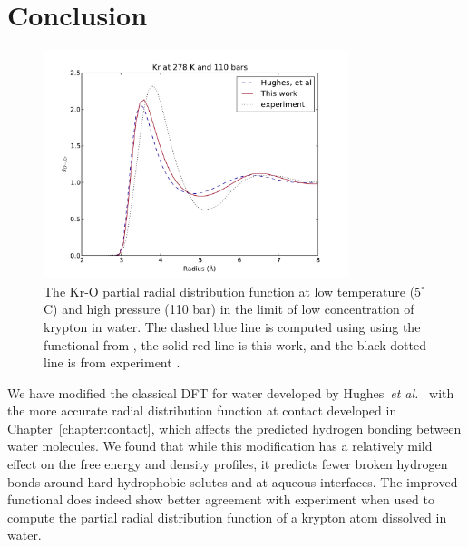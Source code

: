 

\section{Conclusion}

\begin{figure}
\begin{center}
\includegraphics[width=3.5in]{figs/Kr-278K-densities}
\end{center}
\caption{ The Kr-O partial radial distribution function at low
  temperature ($5^\circ$ C) and high pressure (110 bar) in the limit
  of low concentration of krypton in water. The dashed blue line is
  computed using using the functional from \hughesetal, the solid red
  line is this work, and the black dotted line is from experiment
  \cite{bowron1998hydrophobic}. }
\label{fig:g-Kr}
\end{figure}

We have modified the classical DFT for water developed by
Hughes~\emph{et al.}~\cite{hughes2013classical} with the more accurate
radial distribution function at contact developed in
Chapter~\ref{chapter:contact}, which affects the predicted hydrogen
bonding between water molecules.  We found that while this
modification has a relatively mild effect on the free energy and
density profiles, it predicts fewer broken hydrogen bonds around hard
hydrophobic solutes and at aqueous interfaces.
%
The improved functional does indeed show better agreement with
experiment when used to compute the partial radial distribution
function of a krypton atom dissolved in water.

\clearpage

